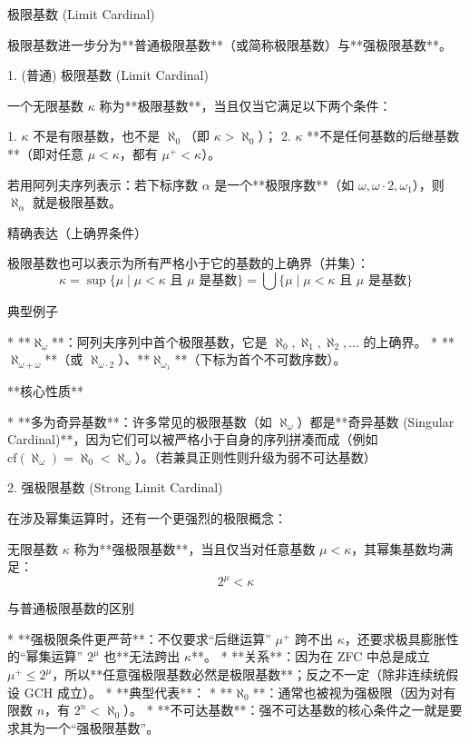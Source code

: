 \documentclass{beamer}
\begin{document}
\begin{frame}{极限基数 (Limit Cardinal)}
\begin{markdown}
极限基数进一步分为**普通极限基数**（或简称极限基数）与**强极限基数**。

1. (普通) 极限基数 (Limit Cardinal)

一个无限基数 $\kappa$ 称为**极限基数**，当且仅当它满足以下两个条件：

1. $\kappa$ 不是有限基数，也不是 $\aleph_0$（即 $\kappa > \aleph_0$）；
2. $\kappa$ **不是任何基数的后继基数**（即对任意 $\mu < \kappa$，都有 $\mu^+ < \kappa$）。

若用阿列夫序列表示：若下标序数 $\alpha$ 是一个**极限序数**（如 $\omega, \omega\cdot 2, \omega_1$），则 $\aleph_\alpha$ 就是极限基数。

精确表达（上确界条件）

极限基数也可以表示为所有严格小于它的基数的上确界（并集）：
$$\kappa = \sup \{ \mu \mid \mu < \kappa \text{ 且 } \mu \text{ 是基数} \} = \bigcup \{ \mu \mid \mu < \kappa \text{ 且 } \mu \text{ 是基数} \}$$

典型例子

* **$\aleph_\omega$**：阿列夫序列中首个极限基数，它是 $\aleph_0, \aleph_1, \aleph_2, \dots$ 的上确界。
* **$\aleph_{\omega+\omega}$**（或 $\aleph_{\omega\cdot 2}$）、**$\aleph_{\omega_1}$**（下标为首个不可数序数）。

**核心性质**

* **多为奇异基数**：许多常见的极限基数（如 $\aleph_\omega$）都是**奇异基数 (Singular Cardinal)**，因为它们可以被严格小于自身的序列拼凑而成（例如 $\text{cf}(\aleph_\omega) = \aleph_0 < \aleph_\omega$）。（若兼具正则性则升级为弱不可达基数）
\end{markdown}
\end{frame}

\begin{frame}
\begin{markdown}
2. 强极限基数 (Strong Limit Cardinal)

在涉及幂集运算时，还有一个更强烈的极限概念：

无限基数 $\kappa$ 称为**强极限基数**，当且仅当对任意基数 $\mu < \kappa$，其幂集基数均满足：
$$2^\mu < \kappa$$

与普通极限基数的区别

* **强极限条件更严苛**：不仅要求“后继运算” $\mu^+$ 跨不出 $\kappa$，还要求极具膨胀性的“幂集运算” $2^\mu$ 也**无法跨出 $\kappa$**。
* **关系**：因为在 ZFC 中总是成立 $\mu^+ \le 2^\mu$，所以**任意强极限基数必然是极限基数**；反之不一定（除非连续统假设 GCH 成立）。
* **典型代表**：
* **$\aleph_0$**：通常也被视为强极限（因为对有限数 $n$，有 $2^n < \aleph_0$）。
* **不可达基数**：强不可达基数的核心条件之一就是要求其为一个“强极限基数”。
\end{markdown}
\end{frame}
\end{document}
